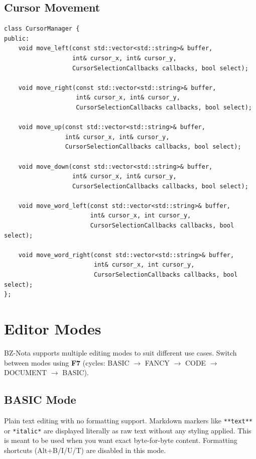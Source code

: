 \documentclass[12pt,a4paper,oneside,openany]{report}
\begin{document}
\subsection{Cursor Movement}

\begin{lstlisting}
class CursorManager {
public:
    void move_left(const std::vector<std::string>& buffer,
                   int& cursor_x, int& cursor_y,
                   CursorSelectionCallbacks callbacks, bool select);
    
    void move_right(const std::vector<std::string>& buffer,
                    int& cursor_x, int& cursor_y,
                    CursorSelectionCallbacks callbacks, bool select);
    
    void move_up(const std::vector<std::string>& buffer,
                 int& cursor_x, int& cursor_y,
                 CursorSelectionCallbacks callbacks, bool select);
    
    void move_down(const std::vector<std::string>& buffer,
                   int& cursor_x, int& cursor_y,
                   CursorSelectionCallbacks callbacks, bool select);
    
    void move_word_left(const std::vector<std::string>& buffer,
                        int& cursor_x, int cursor_y,
                        CursorSelectionCallbacks callbacks, bool select);
    
    void move_word_right(const std::vector<std::string>& buffer,
                         int& cursor_x, int cursor_y,
                         CursorSelectionCallbacks callbacks, bool select);
};
\end{lstlisting}

\section{Editor Modes}

BZ-Nota supports multiple editing modes to suit different use cases. Switch between modes using \textbf{F7} (cycles: BASIC $\rightarrow$ FANCY $\rightarrow$ CODE $\rightarrow$ DOCUMENT $\rightarrow$ BASIC).

\subsection{BASIC Mode}

Plain text editing with no formatting support. Markdown markers like \texttt{**text**} or \texttt{*italic*} are displayed literally as raw text without any styling applied. This is meant to be used when you want exact byte-for-byte content. Formatting shortcuts (Alt+B/I/U/T) are disabled in this mode.
\end{document}

